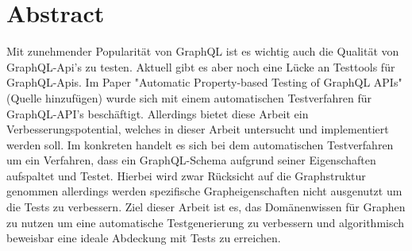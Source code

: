 \section{Abstract}

Mit zunehmender Popularität von GraphQL ist es wichtig auch die Qualität von GraphQL-Api's zu testen.
Aktuell gibt es aber noch eine Lücke an Testtools für GraphQL-Apis. Im Paper "Automatic Property-based Testing of
GraphQL APIs" (Quelle hinzufügen) wurde sich mit einem automatischen Testverfahren für GraphQL-API's beschäftigt.
Allerdings bietet diese Arbeit ein Verbesserungspotential, welches in dieser Arbeit untersucht und implementiert werden soll.
Im konkreten handelt es sich bei dem automatischen Testverfahren um ein Verfahren, dass ein GraphQL-Schema aufgrund seiner
Eigenschaften aufspaltet und Testet. Hierbei wird zwar Rücksicht auf die Graphstruktur genommen allerdings werden spezifische
Grapheigenschaften nicht ausgenutzt um die Tests zu verbessern. Ziel dieser Arbeit ist es, das Domänenwissen für Graphen zu nutzen
um eine automatische Testgenerierung zu verbessern und algorithmisch beweisbar eine ideale Abdeckung mit Tests zu erreichen.



